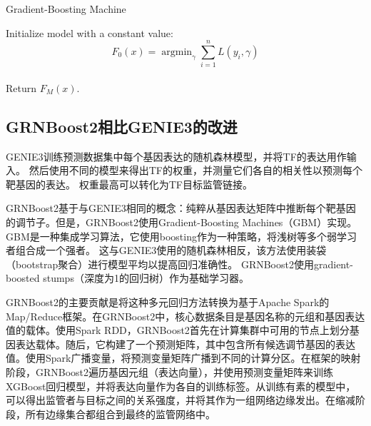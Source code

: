 \begin{algorithm}[H]
  \caption{Gradient-Boosting Machine}
  \SetAlgoLined
  Initialize model with a constant value: $$F_{0}(x) = \mathop{\arg\min}_{\gamma}\sum^{n}_{i=1}L(y_{i},\gamma)$$\\
  Return $F_{M}(x)$.\\
  \label{alg:gbm}
\end{algorithm}

\subsection{GRNBoost2相比GENIE3的改进}
  GENIE3\cite{huynh2010inferring}训练预测数据集中每个基因表达的随机森林模型，并将TF的表达用作输入。 然后使用不同的模型来得出TF的权重，并测量它们各自的相关性以预测每个靶基因的表达。 权重最高可以转化为TF目标监管链接。

  GRNBoost2基于与GENIE3相同的概念：纯粹从基因表达矩阵中推断每个靶基因的调节子。但是，GRNBoost2使用Gradient-Boosting Machines（GBM）\cite{friedman2001greedy}实现。 GBM是一种集成学习算法，它使用boosting\cite{freund1999short}作为一种策略，将浅树等多个弱学习者组合成一个强者。 这与GENIE3使用的随机森林相反，该方法使用装袋（bootstrap聚合）进行模型平均以提高回归准确性。 GRNBoost2使用gradient-boosted stumps（深度为1的回归树）\cite{slawek2013ennet}作为基础学习器。

  GRNBoost2的主要贡献是将这种多元回归方法转换为基于Apache Spark\cite{zaharia2012fast}的Map/Reduce\cite{dean2008mapreduce}框架。在GRNBoost2中，核心数据条目是基因名称的元组和基因表达值的载体。使用Spark RDD，GRNBoost2首先在计算集群中可用的节点上划分基因表达载体。随后，它构建了一个预测矩阵，其中包含所有候选调节基因的表达值。使用Spark广播变量，将预测变量矩阵广播到不同的计算分区。在框架的映射阶段，GRNBoost2遍历基因元组（表达向量），并使用预测变量矩阵来训练XGBoost回归模型，并将表达向量作为各自的训练标签。从训练有素的模型中，可以得出监管者与目标之间的关系强度，并将其作为一组网络边缘发出。在缩减阶段，所有边缘集合都组合到最终的监管网络中。

